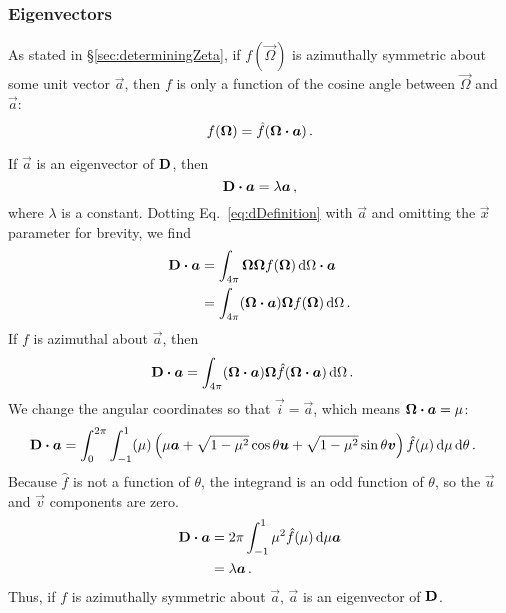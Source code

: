 \subsubsection{Eigenvectors}
As stated in \S\ref{sec:determiningZeta}, if $f(\vec{\Omega})$ is azimuthally
symmetric about some unit vector $\vec{a}$, then $f$ is only a function of the
cosine angle
between $\vec{\Omega}$ and $\vec{a}$:
\begin{equation*}
f(\bm{\Omega}) = \hat f( \bm{\Omega} \bm{\cdot} \bm{a})\,.
\end{equation*}

If $\vec{a}$ is an eigenvector of $\mathbf{D}$, then
\begin{equation*}
  \mathbf{D} \bm{\cdot} \bm{a} = \lambda \bm{a}\,,
\end{equation*}
where $\lambda$ is a constant. Dotting Eq.~\eqref{eq:dDefinition} with
$\vec{a}$ and omitting the $\vec{x}$ parameter for brevity, we find
\begin{align*}
  \mathbf{D} \bm{\cdot} \bm{a}
  &= \int_{4\pi} \bm{\Omega} \bm{\Omega} f(\bm{\Omega}) \mathop{}\!\mathrm{d}\Omega \bm{\cdot} \bm{a}
  \\
  &= \int_{4\pi} (\bm{\Omega} \bm{\cdot} \bm{a}) \bm{\Omega} f(\bm{\Omega}) \mathop{}\!\mathrm{d}\Omega
  \,.
\end{align*}
If $f$ is azimuthal about $\vec{a}$, then
\begin{align*}
  \mathbf{D} \bm{\cdot} \bm{a}
  &= \int_{4\pi} (\bm{\Omega} \bm{\cdot} \bm{a}) \bm{\Omega}
    \hat f(\bm{\Omega} \bm{\cdot} \bm{a}) \mathop{}\!\mathrm{d}\Omega \,.
\end{align*}
We change the angular coordinates so that $\vec{i}=\vec{a}$, which means
$\bm{\Omega} \bm{\cdot} \bm{a}=\mu$:
\begin{align*}
  \mathbf{D} \bm{\cdot} \bm{a}
  &= \int_{0}^{2\pi} \int_{-1}^{1} (\mu)
  \left( \mu \bm{a} + \sqrt{1-\mu^2} \cos \theta \bm{u} + \sqrt{1-\mu^2} \sin
  \theta \bm{v} \right) \hat f(\mu) \mathop{}\!\mathrm{d}\mu \mathop{}\!\mathrm{d}\theta \,.
\end{align*}
Because $\hat f$ is not a function of $\theta$, the integrand is an
odd function of $\theta$, so the $\vec{u}$ and $\vec{v}$ components are zero.
\begin{align*}
  \mathbf{D} \bm{\cdot} \bm{a}
  &= 2\pi \int_{-1}^{1} \mu^2 \hat f(\mu) \mathop{}\!\mathrm{d}\mu \bm{a}
  \\
  &= \lambda \bm{a} \,.
\end{align*}
Thus, if $f$ is azimuthally symmetric about $\vec{a}$, $\vec{a}$ is an
eigenvector of $\mathbf{D}$.

